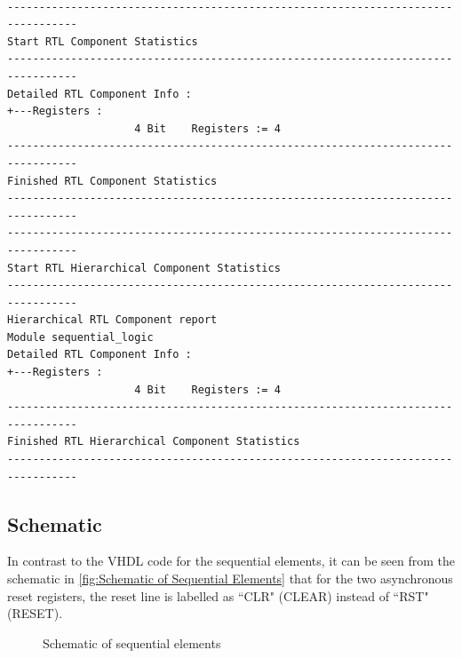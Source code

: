\documentclass[10pt]{article}
\begin{document}
\begin{verbatim}

---------------------------------------------------------------------------------
Start RTL Component Statistics 
---------------------------------------------------------------------------------
Detailed RTL Component Info : 
+---Registers : 
	                4 Bit    Registers := 4     
---------------------------------------------------------------------------------
Finished RTL Component Statistics 
---------------------------------------------------------------------------------
---------------------------------------------------------------------------------
Start RTL Hierarchical Component Statistics 
---------------------------------------------------------------------------------
Hierarchical RTL Component report 
Module sequential_logic 
Detailed RTL Component Info : 
+---Registers : 
	                4 Bit    Registers := 4     
---------------------------------------------------------------------------------
Finished RTL Hierarchical Component Statistics
---------------------------------------------------------------------------------
\end{verbatim}


\newpage

\subsection{Schematic}
In contrast to the VHDL code for the sequential elements, it can be seen from the schematic in \autoref{fig:Schematic of Sequential Elements} that for the two asynchronous reset registers, the reset line is labelled as ``CLR" (CLEAR) instead of ``RST" (RESET). 

\begin{figure}[ht]
    \centering
    \caption{Schematic of sequential elements}
    \label{fig:Schematic of Sequential Elements}
\end{figure}
\newpage
\end{document}
